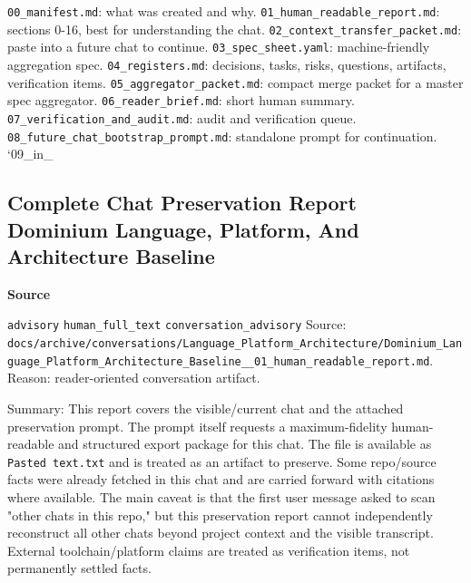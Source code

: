 \documentclass[9pt,a4paper,openany]{book}
\newcommand{\vonecallout}[3]{\par\medskip\noindent\begingroup\setlength{\fboxsep}{7pt}\colorbox{DomCalloutBg}{\parbox{0.94\linewidth}{\textbf{\textcolor{#1}{#2}}\par #3}}\endgroup\par\medskip}
\begin{document}
\texttt{00\_\allowbreak{}manifest.\allowbreak{}md}: what was created and why.\allowbreak{} \texttt{01\_\allowbreak{}human\_\allowbreak{}readable\_\allowbreak{}report.\allowbreak{}md}: sections 0-\allowbreak{}16, best for understanding the chat.\allowbreak{} \texttt{02\_\allowbreak{}context\_\allowbreak{}transfer\_\allowbreak{}packet.\allowbreak{}md}: paste into a future chat to continue.\allowbreak{} \texttt{03\_\allowbreak{}spec\_\allowbreak{}sheet.\allowbreak{}yaml}: machine-\allowbreak{}friendly aggregation spec.\allowbreak{} \texttt{04\_\allowbreak{}registers.\allowbreak{}md}: decisions, tasks, risks, questions, artifacts, verification items.\allowbreak{} \texttt{05\_\allowbreak{}aggregator\_\allowbreak{}packet.\allowbreak{}md}: compact merge packet for a master spec aggregator.\allowbreak{} \texttt{06\_\allowbreak{}reader\_\allowbreak{}brief.\allowbreak{}md}: short human summary.\allowbreak{} \texttt{07\_\allowbreak{}verification\_\allowbreak{}and\_\allowbreak{}audit.\allowbreak{}md}: audit and verification queue.\allowbreak{} \texttt{08\_\allowbreak{}future\_\allowbreak{}chat\_\allowbreak{}bootstrap\_\allowbreak{}prompt.\allowbreak{}md}: standalone prompt for continuation.\allowbreak{} `09\_\allowbreak{}in\_\allowbreak{}



\subsection{Complete Chat Preservation Report Dominium Language, Platform, And Architecture Baseline}

\vonecallout{DomSlate}{Source}{\texttt{advisory} \texttt{human\_\allowbreak{}full\_\allowbreak{}text} \texttt{conversation\_\allowbreak{}advisory} Source: \texttt{docs/\allowbreak{}archive/\allowbreak{}conversations/\allowbreak{}Language\_\allowbreak{}Platform\_\allowbreak{}Architecture/\allowbreak{}Dominium\_\allowbreak{}Language\_\allowbreak{}Platform\_\allowbreak{}Architecture\_\allowbreak{}Baseline\_\allowbreak{}\_\allowbreak{}01\_\allowbreak{}human\_\allowbreak{}readable\_\allowbreak{}report.\allowbreak{}md}.\allowbreak{} Reason: reader-\allowbreak{}oriented conversation artifact.\allowbreak{}}

Summary: This report covers the visible/\allowbreak{}current chat and the attached preservation prompt.\allowbreak{} The prompt itself requests a maximum-\allowbreak{}fidelity human-\allowbreak{}readable and structured export package for this chat.\allowbreak{} The file is available as \texttt{Pasted text.\allowbreak{}txt} and is treated as an artifact to preserve.\allowbreak{} Some repo/\allowbreak{}source facts were already fetched in this chat and are carried forward with citations where available.\allowbreak{} The main caveat is that the first user message asked to scan "other chats in this repo," but this preservation report cannot independently reconstruct all other chats beyond project context and the visible transcript.\allowbreak{} External toolchain/\allowbreak{}platform claims are treated as verification items, not permanently settled facts.\allowbreak{}
\end{document}
